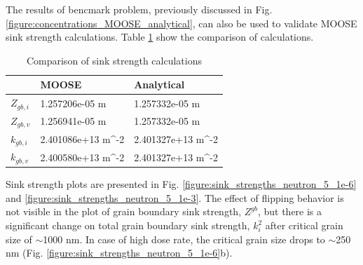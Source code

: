 \documentclass[a4paper]{article}
\begin{document}
  The results of bencmark problem, previously discussed in Fig. \ref{figure:concentrations_MOOSE_analytical}, can also be used to validate MOOSE sink strength calculations. Table \ref{table:sink_strengths_calculations} show the comparison of calculations.
    \begin{table}[h!]
      \centering
      \caption{Comparison of sink strength calculations}
      \label{table:sink_strengths_calculations}
      \begin{tabular}{ ||p{2cm}|p{3cm}|p{3cm}||  }
         \hline
          & MOOSE & Analytical\\
         \hline\hline\hline
         ${Z_{gb,i}}$  & 1.257206e-05 m & 1.257332e-05 m\\
         ${Z_{gb,v}}$  & 1.256941e-05 m & 1.257332e-05 m\\
         ${k_{gb,i}}$  & 2.401086e+13 m^{-2} & 2.401327e+13 m^{-2}\\
         ${k_{gb,v}}$  & 2.400580e+13 m^{-2} & 2.401327e+13 m^{-2}\\
         \hline
      \end{tabular}
    \end{table}
    \newpage
    Sink strength plots are presented in Fig. \ref{figure:sink_strengths_neutron_5_1e-6} and \ref{figure:sink_strengths_neutron_5_1e-3}. The effect of flipping behavior is not visible in the plot of grain boundary sink strength, ${Z^{gb}}$, but there is a significant change on total grain boundary sink strength, ${k^2_i}$ after critical grain size of ${\sim}$1000 nm. In case of high dose rate, the critical grain size drops to ${\sim}$250 nm (Fig. \ref{figure:sink_strengths_neutron_5_1e-6}b).
\end{document}
